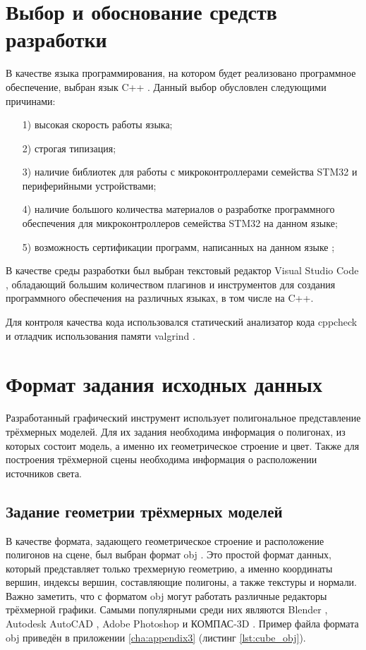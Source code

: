 \section{Выбор и обоснование средств разработки}
В качестве языка программирования, на котором будет реализовано программное обеспечение, выбран язык C++ \cite{cpp}.
Данный выбор обусловлен следующими причинами:
\begin{enumerate}
	\item[1)] высокая скорость работы языка;
	\item[2)] строгая типизация;
	\item[3)] наличие библиотек для работы с микроконтроллерами семейства STM32 и периферийными устройствами;
	\item[4)] наличие большого количества материалов о разработке программного обеспечения для микроконтроллеров семейства STM32 на данном языке;
	\item[5)] возможность сертификации программ, написанных на данном языке \cite{fstec};
\end{enumerate}

В качестве среды разработки был выбран текстовый редактор Visual Studio Code \cite{vscode}, обладающий большим количеством плагинов 
и инструментов для создания программного обеспечения на различных языках, в том числе на C++.

Для контроля качества кода использовался статический анализатор кода cppcheck \cite{cppcheck} и отладчик использования памяти 
valgrind \cite{valgrind}.



\section{Формат задания исходных данных}
Разработанный графический инструмент использует полигональное представление трёхмерных моделей. Для их задания необходима информация 
о полигонах, из которых состоит модель, а именно их геометрическое строение и цвет. Также для построения трёхмерной сцены необходима 
информация о расположении источников света.

\subsection{Задание геометрии трёхмерных моделей}
В качестве формата, задающего геометрическое строение и расположение полигонов на сцене, был выбран формат obj \cite{obj}. Это  простой 
формат данных, который представляет только трехмерную геометрию, а именно координаты вершин, индексы вершин, 
составляющие полигоны, а также текстуры и нормали. Важно заметить, что с форматом obj могут работать различные редакторы 
трёхмерной графики. Самыми популярными среди них являются Blender \cite{blender}, Autodesk AutoCAD \cite{autocad}, 
Adobe Photoshop \cite{photoshop} и КОМПАС-3D \cite{compass}. Пример файла формата obj приведён в приложении \ref{cha:appendix3} 
(листинг \ref{lst:cube_obj}).

